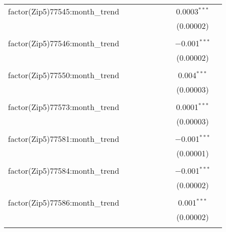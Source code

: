 \begin{table}[H]
{\begin{tabular}{@{\extracolsep{5pt}}lcccccccc}
  factor(Zip5)77545:month\_trend &  &  &  &  &  &  & 0.0003$^{***}$ &  \\  

   &  &  &  &  &  &  & (0.00002) &  \\  

   & & & & & & & & \\  

  factor(Zip5)77546:month\_trend &  &  &  &  &  &  & $-$0.001$^{***}$ &  \\  

   &  &  &  &  &  &  & (0.00002) &  \\  

   & & & & & & & & \\  

  factor(Zip5)77550:month\_trend &  &  &  &  &  &  & 0.004$^{***}$ &  \\  

   &  &  &  &  &  &  & (0.00003) &  \\  

   & & & & & & & & \\  

  factor(Zip5)77573:month\_trend &  &  &  &  &  &  & 0.0001$^{***}$ &  \\  

   &  &  &  &  &  &  & (0.00003) &  \\  

   & & & & & & & & \\  

  factor(Zip5)77581:month\_trend &  &  &  &  &  &  & $-$0.001$^{***}$ &  \\  

   &  &  &  &  &  &  & (0.00001) &  \\  

   & & & & & & & & \\  

  factor(Zip5)77584:month\_trend &  &  &  &  &  &  & $-$0.001$^{***}$ &  \\  

   &  &  &  &  &  &  & (0.00002) &  \\  

   & & & & & & & & \\  

  factor(Zip5)77586:month\_trend &  &  &  &  &  &  & 0.001$^{***}$ &  \\  

   &  &  &  &  &  &  & (0.00002) &  \\  

   & & & & & & & & \\  


\end{tabular}}
\end{table}
